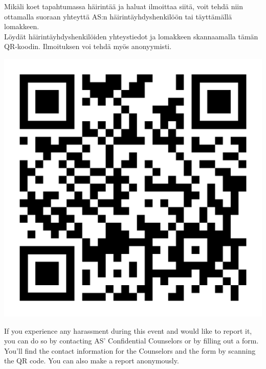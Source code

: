 \documentclass[10pt]{article}
\begin{document}
\begin{center}


\newpage

\thispagestyle{empty}
\mbox{}
\newpage

Mikäli koet tapahtumassa häirintää ja haluat ilmoittaa siitä, voit tehdä niin ottamalla suoraan yhteyttä AS:n häirintäyhdyshenkilöön tai täyttämällä lomakkeen. \\Löydät häirintäyhdyshenkilöiden yhteystiedot ja lomakkeen skannaamalla tämän QR-koodin. Ilmoituksen voi tehdä myös anonyymisti.

\includegraphics[scale=0.17]{../kuvat/hairinta_qr.PNG}

If you experience any harassment during this event and would like to report it, you can do so by contacting AS' Confidential Counselors or by filling out a form. You'll find the contact information for the Counselors and the form by scanning the QR code. You can also make a report anonymously.


\end{center}
\newpage

\end{document}
